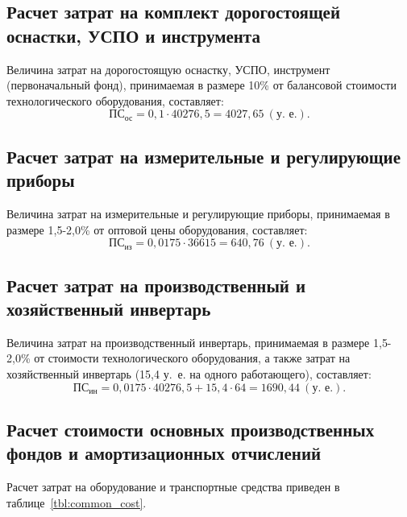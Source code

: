 \subsection{Расчет затрат на комплект дорогостоящей оснастки,
  УСПО и инструмента}

Величина затрат на дорогостоящую оснастку, УСПО, 
инструмент (первоначальный фонд), принимаемая в размере 10\% от 
балансовой стоимости технологического оборудования, составляет:
\begin{equation*}
  \text{ПС}_{\text{ос}} = 0{,}1 \cdot 40276{,}5 = 4027{,}65 \: (\text{у.~е.}).
\end{equation*}

\subsection{Расчет затрат на измерительные и
  регулирующие приборы}

Величина затрат на измерительные и регулирующие приборы,
принимаемая в размере 1{,}5-2{,}0\% от 
оптовой цены оборудования, составляет:
\begin{equation*}
  \text{ПС}_{\text{из}} = 0{,}0175 \cdot 36615 = 640{,}76 \: (\text{у.~е.}).
\end{equation*}

\subsection{Расчет затрат на производственный и
  хозяйственный инвертарь}

Величина затрат на производственный инвертарь,
принимаемая в размере 1{,}5-2{,}0\% от 
стоимости технологического оборудования, а также 
затрат на хозяйственный инвертарь 
(15{,}4 у.~е. на одного работающего), составляет:
\begin{equation*}
  \text{ПС}_{\text{ин}} = 
  0{,}0175 \cdot 40276{,}5 + 15{,}4 \cdot 64 = 1690{,}44 \: (\text{у.~е.}).
\end{equation*}

\subsection{Расчет стоимости основных производственных фондов и
амортизационных отчислений}

Расчет затрат на оборудование и транспортные средства
приведен в таблице~\ref{tbl:common_cost}.

